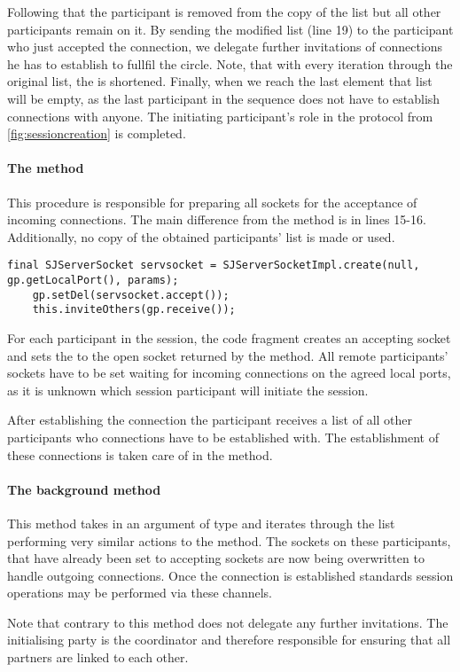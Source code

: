 Following that the participant is removed from the copy of the list but all other participants remain on it. By sending the modified list (line 19) to the participant who just accepted the connection, we delegate further invitations of connections he has to establish to fullfil the circle. Note, that with every iteration through the original list, the  is shortened. Finally, when we reach the last element that list will be empty, as the last participant in the sequence does not have to establish connections with anyone. The initiating participant's role in the protocol from \autoref{fig:sessioncreation} is completed. 


\paragraph*{The  method} This procedure is responsible for preparing all sockets for the acceptance of incoming connections. The main difference from the  method is in lines 15-16. Additionally, no copy of the obtained participants' list is made or used.

\begin{lstlisting}[basicstyle=\LISTINGSTYLE]
	final SJServerSocket servsocket = SJServerSocketImpl.create(null, gp.getLocalPort(), params);
	gp.setDel(servsocket.accept());
	this.inviteOthers(gp.receive());	
\end{lstlisting}

For each participant in the session, the code fragment creates an accepting socket and sets the  to the open socket returned by the  method. All remote participants' sockets have to be set waiting for incoming connections on the agreed local ports, as it is unknown which session participant will initiate the session.

After establishing the connection the participant receives a list of all other participants who connections have to be established with. The establishment of these connections is taken care of in the  method.

\paragraph*{The  background method}

This method takes in an argument of type  and iterates through the list performing very similar actions to the  method. The sockets on these participants, that have already been set to accepting sockets are now being overwritten to handle outgoing connections. Once the connection is established standards session operations may be performed via these channels.

Note that contrary to  this method does not delegate any further invitations. The initialising party is the coordinator and therefore responsible for ensuring that all partners are linked to each other.